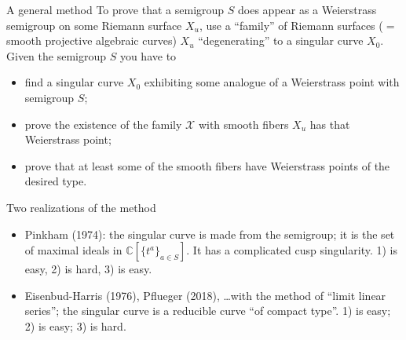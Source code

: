 \documentclass[12pt, aspectratio=169]{beamer}
\def\C{{\mathbb C}}
\begin{document}
\begin{frame}{A general method}
To prove that a semigroup $S$ does appear as a Weierstrass semigroup on some
Riemann surface $X_{u}$, use a ``family'' of
Riemann surfaces  ($=$ smooth projective algebraic curves) $X_u$ ``degenerating'' to a singular curve $X_0$.
 Given the semigroup $S$ you
have to
\begin{itemize}
\item find a singular curve $X_0$ exhibiting some analogue of a Weierstrass point with semigroup $S$;
\item prove the existence of the family $\mathcal X$ with smooth fibers $X_u$ has that Weierstrass point;
\item prove that at least some of the smooth fibers have Weierstrass points of the desired type.

\end{itemize}

\end{frame}



\begin{frame}{Two realizations of the method}


\begin{itemize}
 \item Pinkham (1974): the singular curve is made from the semigroup; it is the set 
of maximal ideals in $\C[\{t^a\}_{a\in S}]$. It has a complicated cusp singularity. 1) is easy, 2) is hard, 3) is easy.

\item Eisenbud-Harris (1976), Pflueger (2018), \dots with the method of ``limit linear series''; the singular curve is a reducible curve ``of compact type''. 1) is easy; 2) is easy; 3) is hard.
\end{itemize}
\end{frame}
\end{document}
